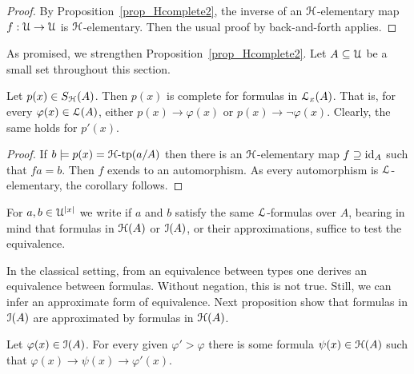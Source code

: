 \documentclass[10pt,oneside]{amsproc}
\renewcommand*{\emph}[1]{%
   \smash{\tikz[baseline]\node[rectangle, fill=teal!25, rounded corners, inner xsep=0.5ex, inner ysep=0.2ex, anchor=base, minimum height = 2.7ex]{\strut #1};}}
\begin{document}
\begin{proof}
  By Proposition~\ref{prop_Hcomplete2}, the inverse of an ${\EuScript H}$-elementary map $f:{\EuScript U}\to{\EuScript U}$ is ${\EuScript H}$-elementary.
  Then the usual proof by back-and-forth applies.
\end{proof}

As promised, we strengthen Proposition~\ref{prop_Hcomplete2}.
Let $A\subseteq{\EuScript U}$ be a small set throughout this section.

\begin{corollary}\label{corol_Lcomplete}
  Let $p(x)\in S_{\EuScript H}(A)$.
  Then $p(x)$ is complete for formulas in ${\EuScript L}_x(A)$.
  That is, for every $\varphi(x)\in{\EuScript L}(A)$, either $p(x)\rightarrow\varphi(x)$ or $p(x)\rightarrow\neg\varphi(x)$.
  Clearly, the same holds for $p'(x)$.
\end{corollary}

\begin{proof}
  If $b\models p(x)={\EuScript H}\mbox{-tp}(a/A)$ then there is an ${\EuScript H}$-elementary map $f\supseteq{\rm id}_A$ such that $fa=b$.
  Then $f$ exends to an automorphism.
  As every automorphism is ${\EuScript L}$-elementary, the corollary follows.
\end{proof}

For $a,b\in {\EuScript U}^{|x|}$ we write \emph{$a\equiv_Ab$\/} if $a$ and $b$ satisfy the same ${\EuScript L}$-formulas over $A$, bearing in mind that formulas in ${\EuScript H}(A)$ or ${\EuScript I}(A)$, or their approximations, suffice to test the equivalence.

In the classical setting, from an equivalence between types one derives an  equivalence between formulas.
Without negation, this is not true.
Still, we can infer an approximate form of equivalence.
Next proposition show that formulas in ${\EuScript I}(A)$ are approximated by formulas in ${\EuScript H}(A)$.

\begin{proposition}\label{prop_LHapprox1}
  Let $\varphi(x)\in{\EuScript I}(A)$.
  For every given $\varphi'>\varphi$ there is some formula $\psi(x)\in{\EuScript H}(A)$ such that $\varphi(x)\rightarrow\psi(x)\rightarrow\varphi'(x)$.
\end{proposition}
\end{document}
